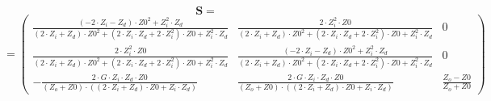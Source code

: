 \[ \mathbf{S}= \]
\[ =\left(\begin{smallmatrix} \frac{\left(-2\cdot Z_i - Z_d
\right)\cdot Z0^2+ Z_i ^2\cdot Z_d }{\left(2\cdot Z_i + Z_d
\right)\cdot Z0^2+\left(2\cdot Z_i \cdot Z_d +2\cdot Z_i
^2\right)\cdot Z0+ Z_i ^2\cdot Z_d } & \frac{2\cdot Z_i ^2\cdot
Z0}{\left(2\cdot Z_i + Z_d \right)\cdot Z0^2+\left(2\cdot Z_i \cdot
Z_d +2\cdot Z_i ^2\right)\cdot Z0+ Z_i ^2\cdot Z_d } & 0 \\
\frac{2\cdot Z_i ^2\cdot Z0}{\left(2\cdot Z_i + Z_d \right)\cdot
Z0^2+\left(2\cdot Z_i \cdot Z_d +2\cdot Z_i ^2\right)\cdot Z0+ Z_i
^2\cdot Z_d } & \frac{\left(-2\cdot Z_i - Z_d \right)\cdot Z0^2+ Z_i
^2\cdot Z_d }{\left(2\cdot Z_i + Z_d \right)\cdot Z0^2+\left(2\cdot
Z_i \cdot Z_d +2\cdot Z_i ^2\right)\cdot Z0+ Z_i ^2\cdot Z_d } & 0 \\
-\frac{2\cdot G \cdot Z_i \cdot Z_d \cdot Z0}{\left( Z_o
+Z0\right)\cdot \left(\left(2\cdot Z_i + Z_d \right)\cdot Z0+ Z_i
\cdot Z_d \right)} & \frac{2\cdot G \cdot Z_i \cdot Z_d \cdot
Z0}{\left( Z_o +Z0\right)\cdot \left(\left(2\cdot Z_i + Z_d
\right)\cdot Z0+ Z_i \cdot Z_d \right)} & \frac{ Z_o -Z0}{ Z_o +Z0}
\end{smallmatrix}\right) \]
